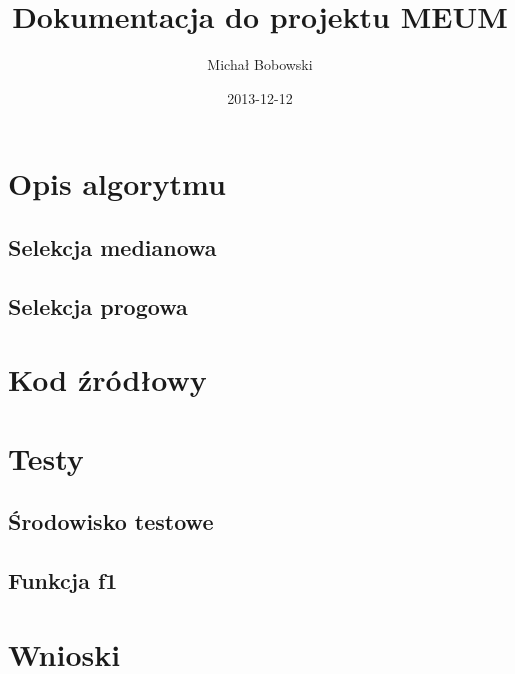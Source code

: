 \documentclass[11pt]{article}
\author{Michał Bobowski}
\date{2013-12-12}
\title{Dokumentacja do projektu MEUM}
\begin{document}
  \maketitle

\section{Opis algorytmu}
\subsection{Selekcja medianowa}
\subsection{Selekcja progowa}

\section{Kod źródłowy}

\section{Testy}
\subsection{Środowisko testowe}
\subsection{Funkcja f1}

\section{Wnioski}
\end{document}
